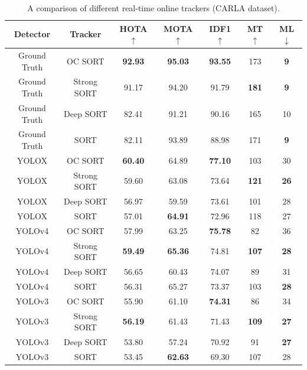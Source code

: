 \begin{table}[H]
\centering
{}
\begin{tabular}{ ccccccc } 
\hline
\rowcolor{gray!50}
Detector & Tracker & HOTA $\uparrow$ & MOTA $\uparrow$ & IDF1 $\uparrow$ & MT $\uparrow$ & ML $\downarrow$ \\
\hline
Ground Truth & OC SORT      &  \textbf{92.93}  &  \textbf{95.03}  &  \textbf{93.55}  &  173  &  \textbf{9}  \\
Ground Truth & Strong SORT  &  91.17  &  94.20  &  91.79  &  \textbf{181}  &  \textbf{9}  \\ 
Ground Truth & Deep SORT    &  82.41  &  91.21  &  90.16  &  165  &  10  \\ 
Ground Truth & SORT         &  82.11  &  93.89  &  88.98  &  171  &  \textbf{9}  \\ 
\hline
YOLOX & OC SORT      &  \textbf{60.40}  &  64.89  &  \textbf{77.10}  &  103  &  30  \\
YOLOX & Strong SORT  &  59.60  &  63.08  &  73.64  &  \textbf{121}  &  \textbf{26}   \\ 
YOLOX & Deep SORT    &  56.97  &  59.59  &  73.61  &  101  &  28  \\ 
YOLOX & SORT         &  57.01  &  \textbf{64.91}  &  72.96  &  118  &  27  \\ 
\hline
YOLOv4 & OC SORT      &  57.99  &  63.25  &  \textbf{75.78}  &  82  &  36  \\
YOLOv4 & Strong SORT  &  \textbf{59.49}  &  \textbf{65.36}  &  74.81  &  \textbf{107}  &  \textbf{28}  \\ 
YOLOv4 & Deep SORT    &  56.65  &  60.43  &  74.07  &  89  &  31  \\ 
YOLOv4 & SORT         &  56.31  &  65.27  &  73.37  &  103  &  \textbf{28}  \\ 
\hline
YOLOv3 & OC SORT      &  55.90  &  61.10  &  \textbf{74.31}  &  86  &  34  \\
YOLOv3 & Strong SORT  &  \textbf{56.19}  &  61.43  &  71.43  &  \textbf{109}  &  \textbf{27}  \\ 
YOLOv3 & Deep SORT    &  53.80  &  57.24  &  70.92  &  91  &  \textbf{27}  \\ 
YOLOv3 & SORT         &  53.45  &  \textbf{62.63}  &  69.30  &  107  &  28  \\ 
\hline
\end{tabular}
\caption{A comparison of different real-time online trackers (CARLA dataset).}
\label{tab.carla}
\end{table}

